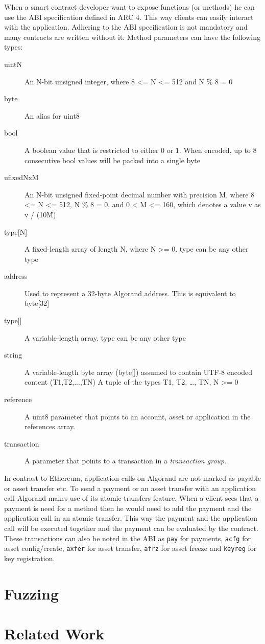 When a smart contract developer want to expose functions (or methods) he can use the \ac{ABI} specification defined in \ac{ARC} 4. This way clients can easily interact with the application. Adhering to the \ac{ABI} specification is not mandatory and many contracts are written without it. Method parameters can have the following types:
\begin{description}
    \item[uintN] An N-bit unsigned integer, where 8 <= N <= 512 and N \% 8 = 0
    \item[byte]	An alias for uint8
    \item[bool]	A boolean value that is restricted to either 0 or 1. When encoded, up to 8 consecutive bool values will be packed into a single byte
    \item[ufixedNxM] An N-bit unsigned fixed-point decimal number with precision M, where 8 <= N <= 512, N \% 8 = 0, and 0 < M <= 160, which denotes a value v as v / (10\^M)

        \item[{type[N]}] A fixed-length array of length N, where N >= 0. type can be any other type
    \item[address] Used to represent a 32-byte Algorand address. This is equivalent to byte[32]

        \item[{type[]}] A variable-length array. type can be any other type
    \item[string] A variable-length byte array (byte[]) assumed to contain UTF-8 encoded content
        (T1,T2,...,TN) A tuple of the types T1, T2, …, TN, N >= 0
    \item[reference] A uint8 parameter that points to an account, asset or application in the references array.
    \item[transaction] A parameter that points to a transaction in a \textit{transaction group}.
\end{description}

In contrast to Ethereum, application calls on Algorand are not marked as payable or asset transfer etc. To send a payment or an asset transfer with an application call Algorand makes use of its atomic transfers feature. When a client sees that a payment is need for a method then he would need to add the payment and the application call in an atomic transfer. This way the payment and the application call will be executed together and the payment can be evaluated by the contract. These transactions can also be noted in the \ac{ABI} as \texttt{pay} for payments, \texttt{acfg} for asset config/create, \texttt{axfer} for asset transfer, \texttt{afrz} for asset freeze and \texttt{keyreg} for key registration.



\section{Fuzzing} \label{section:fuzzing}

\section{Related Work}
